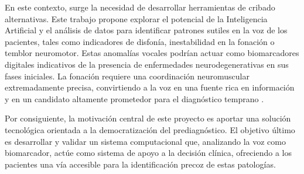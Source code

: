 En este contexto, surge la necesidad de desarrollar herramientas de cribado alternativas. Este trabajo propone explorar el potencial de la Inteligencia Artificial y el análisis de datos para identificar patrones sutiles en la voz de los pacientes, tales como indicadores de disfonía, inestabilidad en la fonación o temblor neuromotor. Estas anomalías vocales podrían actuar como biomarcadores digitales indicativos de la presencia de enfermedades neurodegenerativas en sus fases iniciales. La fonación requiere una coordinación neuromuscular extremadamente precisa, convirtiendo a la voz en una fuente rica en información y en un candidato altamente prometedor para el diagnóstico temprano \cite{romero2018}.

Por consiguiente, la motivación central de este proyecto es aportar una solución tecnológica orientada a la democratización del prediagnóstico. El objetivo último es desarrollar y validar un sistema computacional que, analizando la voz como biomarcador, actúe como sistema de apoyo a la decisión clínica, ofreciendo a los pacientes una vía accesible para la identificación precoz de estas patologías.
